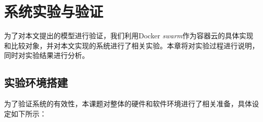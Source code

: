 
\chapter{系统实验与验证}\label{chap:sys_eval}
为了对本文提出的模型进行验证，我们利用Docker \emph{swarm}作为容器云的具体实现和比较对象，并对本文实现的系统进行了相关实验。本章将对实验过程进行说明，同时对实验结果进行分析。

\section{实验环境搭建}\label{sec:env_prep}
为了验证系统的有效性，本课题对整体的硬件和软件环境进行了相关准备，具体设定如下所示：

